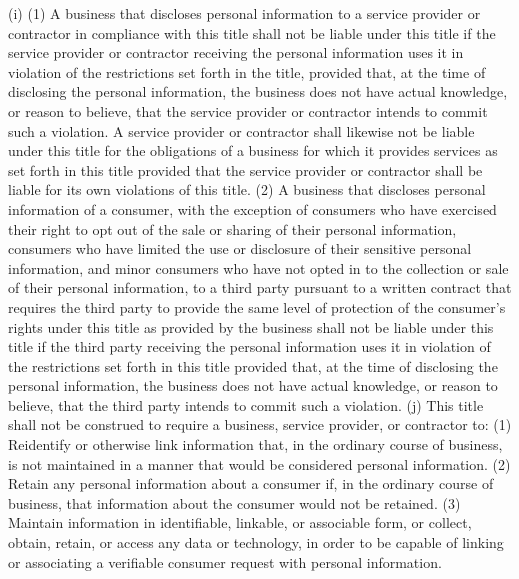 (i) (1) A business that discloses personal information to a service provider or contractor in compliance with this title shall not be liable under this title if the service provider or contractor receiving the personal information uses it in violation of the restrictions set forth in the title, provided that, at the time of disclosing the personal information, the business does not have actual knowledge, or reason to believe, that the service provider or contractor intends to commit such a violation. A service provider or contractor shall likewise not be liable under this title for the obligations of a business for which it provides services as set forth in this title provided that the service provider or contractor shall be liable for its own violations of this title.
(2) A business that discloses personal information of a consumer, with the exception of consumers who have exercised their right to opt out of the sale or sharing of their personal information, consumers who have limited the use or disclosure of their sensitive personal information, and minor consumers who have not opted in to the collection or sale of their personal information, to a third party pursuant to a written contract that requires the third party to provide the same level of protection of the consumer’s rights under this title as provided by the business shall not be liable under this title if the third party receiving the personal information uses it in violation of the restrictions set forth in this title provided that, at the time of disclosing the personal information, the business does not have actual knowledge, or reason to believe, that the third party intends to commit such a violation.
(j) This title shall not be construed to require a business, service provider, or contractor to:
(1) Reidentify or otherwise link information that, in the ordinary course of business, is not maintained in a manner that would be considered personal information.
(2) Retain any personal information about a consumer if, in the ordinary course of business, that information about the consumer would not be retained.
(3) Maintain information in identifiable, linkable, or associable form, or collect, obtain, retain, or access any data or technology, in order to be capable of linking or associating a verifiable consumer request with personal information.
